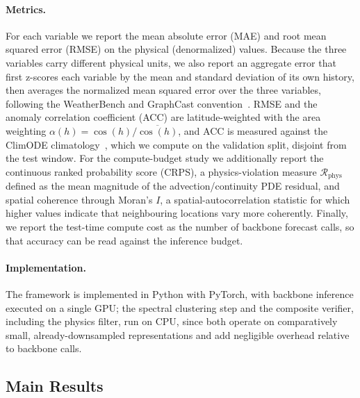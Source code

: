 \documentclass[preprint,12pt]{elsarticle}
\begin{document}
\paragraph{Metrics.} For each variable we report the mean absolute error (MAE) and root mean squared error (RMSE) on the physical (denormalized) values. Because the three variables carry different physical units, we also report an aggregate error that first z-scores each variable by the mean and standard deviation of its own history, then averages the normalized mean squared error over the three variables, following the WeatherBench and GraphCast convention~\citep{lam2023graphcast}. RMSE and the anomaly correlation coefficient (ACC) are latitude-weighted with the area weighting $\alpha(h)=\cos(h)/\overline{\cos(h)}$, and ACC is measured against the ClimODE climatology~\citep{verma2024climode}, which we compute on the validation split, disjoint from the test window. For the compute-budget study we additionally report the continuous ranked probability score (CRPS), a physics-violation measure $\mathcal{R}_{\text{phys}}$ defined as the mean magnitude of the advection/continuity PDE residual, and spatial coherence through Moran's $I$, a spatial-autocorrelation statistic for which higher values indicate that neighbouring locations vary more coherently. Finally, we report the test-time compute cost as the number of backbone forecast calls, so that accuracy can be read against the inference budget.

\paragraph{Implementation.} The framework is implemented in Python with PyTorch, with backbone inference executed on a single GPU; the spectral clustering step and the composite verifier, including the physics filter, run on CPU, since both operate on comparatively small, already-downsampled representations and add negligible overhead relative to backbone calls. 
\subsection{Main Results}
\label{sec:main_results}
\end{document}
